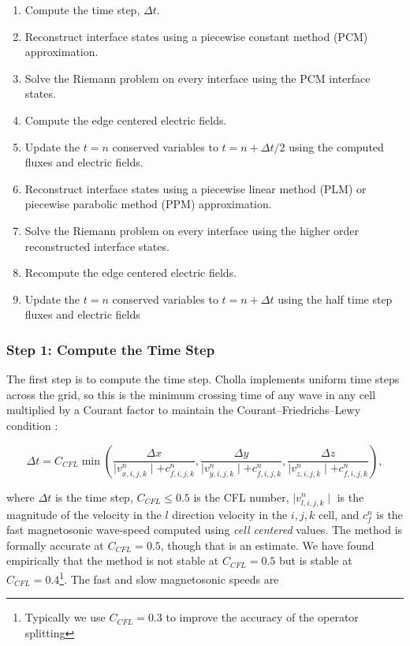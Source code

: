 \documentclass[modern]{aastex631}
\begin{document}
\begin{enumerate}
    \item Compute the time step, $\Delta t$.
    \item Reconstruct interface states using a piecewise constant method (PCM) approximation.
    \item Solve the Riemann problem on every interface using the PCM interface states.
    \item Compute the edge centered electric fields.
    \item Update the $t=n$ conserved variables to $t=n+\Delta t/2$ using the computed fluxes and electric fields.
    \item Reconstruct interface states using a piecewise linear method (PLM) or piecewise parabolic method (PPM) approximation.
    \item Solve the Riemann problem on every interface using the higher order reconstructed interface states.
    \item Recompute the edge centered electric fields.
    \item Update the $t=n$ conserved variables to $t=n+\Delta t$ using the half time step fluxes and electric fields
\end{enumerate}


\subsubsection{Step 1: Compute the Time Step}
\label{vlct:dt}

The first step is to compute the time step. Cholla implements uniform time steps across the grid, so this is the minimum crossing time of any wave in any cell multiplied by a Courant factor to maintain the Courant–Friedrichs–Lewy condition \cite{cfl}:

\begin{equation}
        \label{eqn:dt}
        \Delta t = C_{CFL} \min \left(
            \frac{\Delta x}{\mid v^n_{x,i,j,k} \mid + c^n_{f,i,j,k}},
            \frac{\Delta y}{\mid v^n_{y,i,j,k} \mid + c^n_{f,i,j,k}},
            \frac{\Delta z}{\mid v^n_{z,i,j,k} \mid + c^n_{f,i,j,k}}
        \right),
\end{equation}

\noindent where $\Delta t$ is the time step, $C_{CFL} \leq 0.5$ is the CFL number, $\mid v^n_{l,i,j,k}\mid $ is the magnitude of the velocity in the $l$ direction velocity in the ${i,j,k}$ cell, and $c^n_f $ is the fast magnetosonic wave-speed computed using \emph{cell centered} values. The method is formally accurate at $C_{CFL} = 0.5$, though that is an estimate\citep{stone_2009}. We have found empirically that the method is not stable at $C_{CFL} = 0.5$ but is stable at $C_{CFL} = 0.4$\footnote{Typically we use $C_{CFL} = 0.3$ to improve the accuracy of the operator splitting}. The fast and slow magnetosonic speeds are
\end{document}
